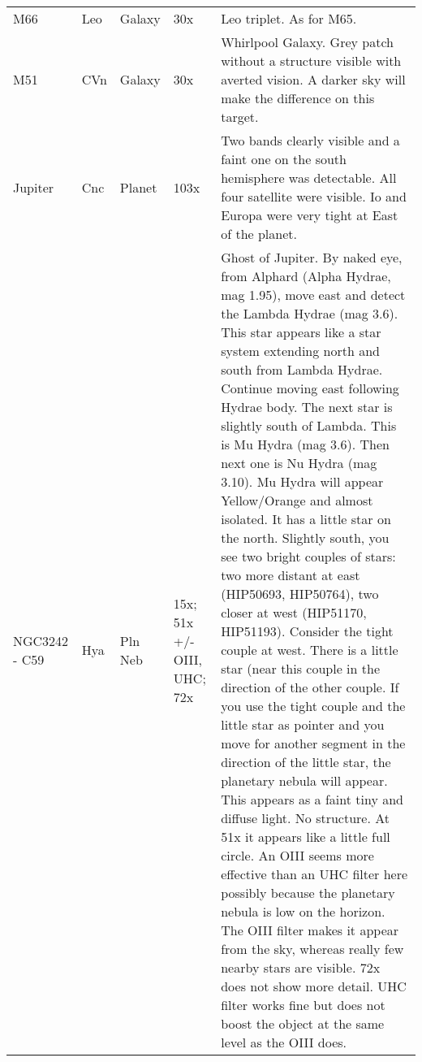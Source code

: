 \begin{longtable}{ p{0.7in}  p{0.3in}  p{0.6in}  p{0.9in}  p{5.8in} }
M66 & Leo & Galaxy & 30x & Leo triplet. As for M65.  \\ 
M51 & CVn & Galaxy & 30x & Whirlpool Galaxy. Grey patch without a structure visible with averted vision. A darker sky will make the difference on this target. \\ 
Jupiter & Cnc & Planet & 103x & Two bands clearly visible and a faint one on the south hemisphere was detectable. All four satellite were visible. Io and Europa were very tight at East of the planet. \\ 
NGC3242 - C59 & Hya & Pln Neb & 15x; 51x +/- OIII, UHC; 72x & Ghost of Jupiter. By naked eye, from Alphard (Alpha Hydrae, mag 1.95), move east and detect the Lambda Hydrae (mag 3.6). This star appears like a star system extending north and south from Lambda Hydrae. Continue moving east following Hydrae body. The next star is slightly south of Lambda. This is Mu Hydra (mag 3.6). Then next one is Nu Hydra (mag 3.10). Mu Hydra will appear Yellow/Orange and almost isolated. It has a little star on the north. Slightly south, you see two bright couples of stars: two more distant at east (HIP50693, HIP50764), two closer at west (HIP51170, HIP51193). Consider the tight couple at west. There is a little star (near this couple in the direction of the other couple. If you use the tight couple and the little star as pointer and you move for another segment in the direction of the little star, the planetary nebula will appear. This appears as a faint tiny and diffuse light. No structure. At 51x it appears like a little full circle. An OIII seems more effective than an UHC filter here possibly because the planetary nebula is low on the horizon. The OIII filter makes it appear from the sky, whereas really few nearby stars are visible. 72x does not show more detail. UHC filter works fine but does not boost the object at the same level as the OIII does. \\ 
\hline 
\end{longtable} 
